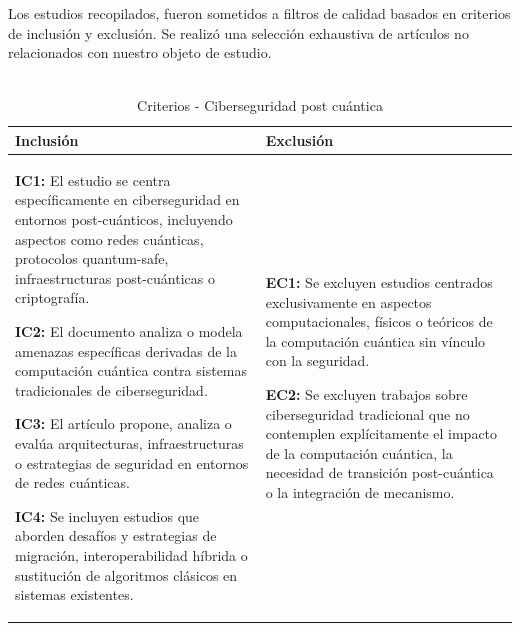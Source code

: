 Los estudios recopilados, fueron sometidos a filtros de calidad basados en criterios de inclusión y exclusión. Se realizó una selección exhaustiva de artículos no relacionados con nuestro objeto de estudio.

\begin{table}[H]
\centering
\caption[Criterios - Ciberseguridad post cuántica]{
    \vspace{4pt}
    \fontsize{12}{11}\selectfont \\
    Criterios - Ciberseguridad post cuántica \\[2pt]
}
\label{criterios}
\begin{tabular}{@{} p{5.45cm} p{7.973cm} @{}} %
\hline\hline
\textbf{Inclusión} & \textbf{Exclusión} \\
\hline
\textbf{IC1:} El estudio se centra específicamente en ciberseguridad en entornos post-cuánticos, incluyendo aspectos como redes cuánticas, protocolos quantum-safe, infraestructuras post-cuánticas o criptografía.\par\vspace{8pt}

\textbf{IC2:} El documento analiza o modela amenazas específicas derivadas de la computación cuántica contra sistemas tradicionales de ciberseguridad.\par\vspace{8pt}

\textbf{IC3:} El artículo propone, analiza o evalúa arquitecturas, infraestructuras o estrategias de seguridad en entornos de redes cuánticas.\par\vspace{8pt}

\textbf{IC4:} Se incluyen estudios que aborden desafíos y estrategias de migración, interoperabilidad híbrida o sustitución de algoritmos clásicos en sistemas existentes.

& \textbf{EC1:} Se excluyen estudios centrados exclusivamente en aspectos computacionales, físicos o teóricos de la computación cuántica sin vínculo con la seguridad.\par\vspace{8pt}

\textbf{EC2:} Se excluyen trabajos sobre ciberseguridad tradicional que no contemplen explícitamente el impacto de la computación cuántica, la necesidad de transición post-cuántica o la integración de mecanismo.\par\vspace{8pt}


\end{tabular}
\end{table}
